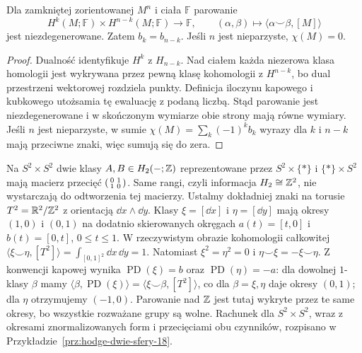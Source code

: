 \begin{wniosek}
\label{cor:pd-parowanie-16}
Dla zamkniętej zorientowanej
$M^n$ i ciała $\mathbb F$
parowanie
\[
 H^k(M;\mathbb F)\times
 H^{n-k}(M;\mathbb F)
 \longrightarrow\mathbb F,\qquad
 (\alpha,\beta)\longmapsto
      \langle\alpha\smile\beta,[M]\rangle
\]
jest niezdegenerowane. Zatem
$b_k=b_{n-k}$. Jeśli $n$
jest nieparzyste, $\chi(M)=0$.
\end{wniosek}
\begin{proof}
Dualność identyfikuje
$H^k$ z $H_{n-k}$.
Nad ciałem każda niezerowa
klasa homologii jest wykrywana
przez pewną klasę kohomologii
z $H^{n-k}$, bo dual przestrzeni
wektorowej rozdziela punkty.
Definicja iloczynu kapowego
i kubkowego utożsamia tę
ewaluację z podaną liczbą.
Stąd parowanie jest
niezdegenerowane i w skończonym
wymiarze obie strony mają
równe wymiary. Jeśli $n$
jest nieparzyste, w sumie
$\chi(M)=\sum_k(-1)^kb_k$
wyrazy dla $k$ i $n-k$
mają przeciwne znaki,
więc sumują się do zera.
\end{proof}

\begin{przyklad}
\label{prz:pd-torus-sfery-21}
Na $S^2\times S^2$ dwie
klasy $A,B\in H_2(-;\mathbb{Z})$
reprezentowane przez
$S^2\times\{*\}$ i
$\{*\}\times S^2$
mają macierz przecięć
$\begin{psmallmatrix}0&1\\1&0\end{psmallmatrix}$.
Same rangi, czyli informacja $H_2\cong\mathbb{Z}^2$,
nie wystarczają do odtworzenia
tej macierzy.
Ustalmy dokładniej znaki na torusie
$T^2=\mathbb{R}^2/\mathbb{Z}^2$ z orientacją $\dd x\wedge\dd y$.
Klasy $\xi=[\dd x]$ i $\eta=[\dd y]$ mają okresy
$(1,0)$ i $(0,1)$ na dodatnio skierowanych okręgach
$a(t)=[t,0]$ i $b(t)=[0,t]$, $0\leq t\leq1$.
W rzeczywistym obrazie kohomologii całkowitej
$\langle\xi\smile\eta,[T^2]\rangle
=\int_{[0,1]^2}\dd x\,\dd y=1$.
Natomiast $\xi^2=\eta^2=0$ i
$\eta\smile\xi=-\xi\smile\eta$.
Z konwencji kapowej wynika
$\operatorname{PD}(\xi)=b$ oraz $\operatorname{PD}(\eta)=-a$:
dla dowolnej $1$-klasy $\beta$ mamy
$\langle\beta,\operatorname{PD}(\xi)\rangle
=\langle\xi\smile\beta,[T^2]\rangle$,
co dla $\beta=\xi,\eta$ daje okresy $(0,1)$; dla $\eta$
otrzymujemy $(-1,0)$.
Parowanie nad $\mathbb{Z}$ jest tutaj wykryte przez te same okresy,
bo wszystkie rozważane grupy są wolne.
Rachunek dla $S^2\times S^2$, wraz z okresami
znormalizowanych form i przecięciami obu czynników,
rozpisano w Przykładzie~\ref{prz:hodge-dwie-sfery-18}.
\end{przyklad}

